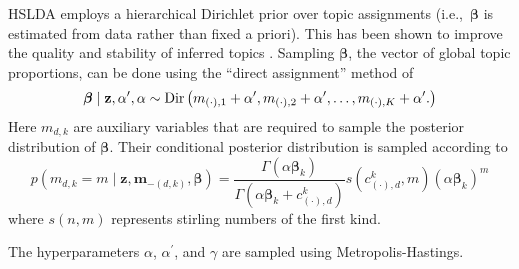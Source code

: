 %
%
%


HSLDA employs a hierarchical Dirichlet prior over topic assignments (i.e.,~$\boldsymbol\beta$ is estimated from data rather than fixed a priori).  This has been shown to improve the quality and stability of inferred topics \cite{WallachMiMc2009}. 
%
Sampling $\boldsymbol\beta$, the vector of global topic proportions,   can be done using the ``direct assignment''
method of \cite{TehJorBea2006} \begin{equation}
\boldsymbol\beta\mid\mathbf{z},\alpha^{\prime},\alpha\sim{\rm Dir}\left(m_{\left(\cdot\right),1}+\alpha^{\prime},m_{\left(\cdot\right),2}+\alpha^{\prime},\ldots,m_{\left(\cdot\right),K}+\alpha^{\prime}.\right)\end{equation}
Here $m_{d,k}$ are auxiliary variables that are required to sample the posterior distribution of $\boldsymbol\beta$.  Their conditional posterior distribution is sampled according to
 \begin{equation}
p\left(m_{d,k}=m\mid\mathbf{z},\mathbf{m}_{-\left(d,k\right)},\boldsymbol\beta\right)=\frac{\Gamma\left(\alpha\boldsymbol\beta_{k}\right)}{\Gamma\left(\alpha\boldsymbol\beta_{k}+c^k_{(\cdot),d}\right)}s\left(c^k_{(\cdot),d},m\right)\left(\alpha\boldsymbol\beta_{k}\right)^{m}\end{equation}
where $s\left(n,m\right)$ represents stirling numbers of the first
kind.



The hyperparameters $\alpha$, $\alpha^{\prime}$, and $\gamma$ are
sampled
using Metropolis-Hastings. 

